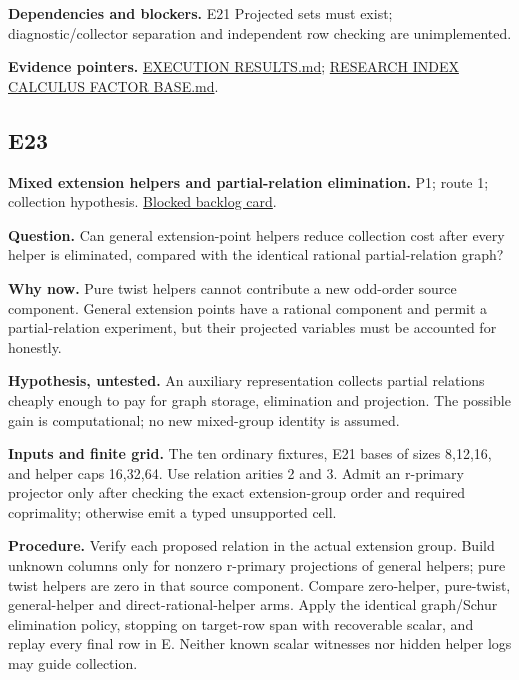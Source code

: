 \documentclass[
  10pt,
]{article}
\begin{document}
\textbf{Dependencies and blockers.} E21 Projected sets must exist;
diagnostic/collector separation and independent row checking are
unimplemented.

\textbf{Evidence pointers.}
\href{../../../research/twist_routes_1_3_20261021/reports/EXECUTION_RESULTS.md}{EXECUTION
RESULTS.md};
\href{../../../research/notes/index-calculus/RESEARCH_INDEX_CALCULUS_FACTOR_BASE.md}{RESEARCH
INDEX CALCULUS FACTOR BASE.md}.

\subsection{E23}\label{e23}

\textbf{Mixed extension helpers and partial-relation elimination.} P1;
route 1; collection hypothesis.
\href{../../../backlog/XP-20261022-twist-partial-relation-elimination/README.md}{Blocked
backlog card}.

\textbf{Question.} Can general extension-point helpers reduce collection
cost after every helper is eliminated, compared with the identical
rational partial-relation graph?

\textbf{Why now.} Pure twist helpers cannot contribute a new odd-order
source component. General extension points have a rational component and
permit a partial-relation experiment, but their projected variables must
be accounted for honestly.

\textbf{Hypothesis, untested.} An auxiliary representation collects
partial relations cheaply enough to pay for graph storage, elimination
and projection. The possible gain is computational; no new mixed-group
identity is assumed.

\textbf{Inputs and finite grid.} The ten ordinary fixtures, E21 bases of
sizes 8,12,16, and helper caps 16,32,64. Use relation arities 2 and 3.
Admit an r-primary projector only after checking the exact
extension-group order and required coprimality; otherwise emit a typed
unsupported cell.

\textbf{Procedure.} Verify each proposed relation in the actual
extension group. Build unknown columns only for nonzero r-primary
projections of general helpers; pure twist helpers are zero in that
source component. Compare zero-helper, pure-twist, general-helper and
direct-rational-helper arms. Apply the identical graph/Schur elimination
policy, stopping on target-row span with recoverable scalar, and replay
every final row in E. Neither known scalar witnesses nor hidden helper
logs may guide collection.
\end{document}
